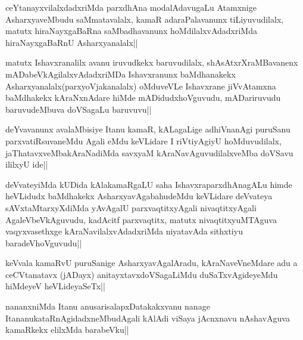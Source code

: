 
\begin{artha}
ceYtanayxvilalxdadxriMda parxdhAna modalAdavugaLu Atamxnige AsharxyaveMbudu saMmatavalalx, kamaR adaraPalavanunx tiLiyuvudilalx, matutx hiraNayxgaBaRna saMbadhavanunx hoMdilalxvAdadxriMda hiraNayxgaBaRnU Asharxyanalalx||
\end{artha}


\begin{artha}
matutx Ishavxranalilx avanu iruvudkekx baruvudilalx, shAsAtxrXraMBavanenx mADabeVkAgilalxvAdadxriMDa Ishavxranunx baMdhanakekx Asharxyanalalx(parxyoVjakanalalx) oMduveVLe Ishavxrane jiVvAtamxna baMdhakekx kAraNxnAdare hiMde mADidudxhoVguvudu, mADariruvudu baruvudeMbuva doVSagaLu baruvuvu||
\end{artha}


\begin{artha}
deYvavanunx avalaMbisiye Itanu kamaR, kALagaLige adhiVnanAgi puruSanu parxvatiRsuvaneMdu Agali eMdu keVLidare I riVtiyAgiyU hoMduvudilalx, jaThatavxveMbakAraNadiMda savxyaM kAraNavAguvudilalxveMba doVSavu ililxyU ide||
\end{artha}


\begin{artha}
deVvateyiMda kUDida kAlakamaRgaLU saha IshavxraparxdhAnagALu himde heVLidudx baMdhakekx AsharxyavAgabahudeMdu keVLidare deVvateya sAVxtaMtarxyXdiMda yAvAgalU parxvaqtitxyAgali nivaqtitxyAgali AgaleVbeVkAguvudu, kadAcitf parxvaqtitx, matutx nivaqtitxyuMTAguva vaqyxvasethxge kAraNavilalxvAdadxriMda niyatavAda sithxtiyu baradeVhoVguvudu||
\end{artha}


\begin{artha}
keVvala kamaRvU puruSanige AsharxyavAgalAradu, kAraNaveVneMdare adu a ceCVtanatavx (jADayx) anitayxtavxdoVSagaLiMdu duSaTxvAgideyeMdu hiMdeyeV heVLideyaSeTx||
\end{artha}

\begin{artha}
nananxniMda Itanu anusarisalapxDatakakxvanu nanage ItananukataRnAgidadxneMbudAgali kAlAdi viSaya jAcnxnavu nAshavAguva kamaRkekx elilxMda barabeVku||
\end{artha}

